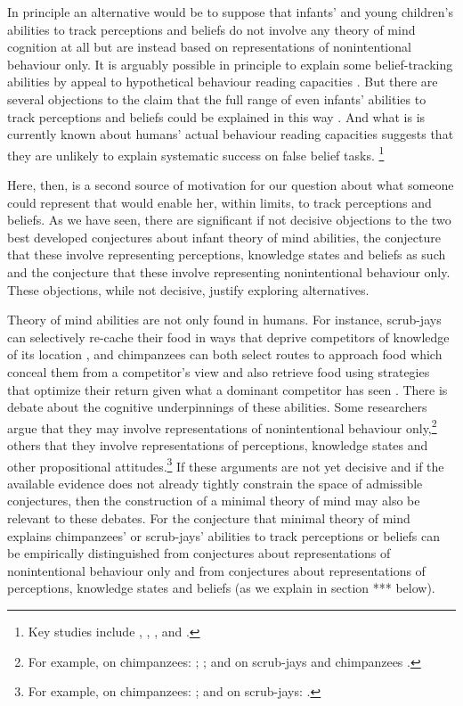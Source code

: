 \documentclass[12pt,\papersize]{extarticle}
\begin{document}
In principle an alternative would be to suppose that infants' and young children's abilities to track perceptions and beliefs 
do not involve any theory of mind cognition at all
but are instead based on 
representations of nonintentional behaviour only.
It is arguably possible in principle to explain some belief-tracking abilities by appeal to hypothetical behaviour reading capacities  \citep{perner:1988_developing,en_1168, en_1169}.
But there are several objections to the claim that the full range of even infants' abilities to track perceptions and beliefs could be explained in this way \citep{en_1691,Apperly:2009ju}.  
And what is is currently known about humans' actual behaviour reading capacities suggests that they are unlikely to explain systematic success on false belief tasks.%
\footnote{
Key studies include
	\citet{Newtson:1976ni}, 
	\citet{Byrne:1999jk},
	\citet{Baldwin:2001rs},
	\citet{Saylor:2007pj} and
	\citet{Baldwin:2008mw}.
} 
 
Here, then, is a second source of motivation for our question about what someone could represent that would enable her, within limits, to track perceptions and beliefs.
As we have seen, there are significant if not decisive objections to the two best developed conjectures about infant theory of mind abilities, the conjecture that these involve representing perceptions, knowledge states and beliefs as such and the conjecture that these involve representing nonintentional behaviour only.  
These objections, while not decisive, justify exploring alternatives.

Theory of mind abilities are not only found in humans.
For instance,
scrub-jays can selectively re-cache their food in ways that deprive competitors of knowledge of its location \citep{Clayton:2007fh}, and  chimpanzees can both select routes to approach food which conceal them from a competitor’s view \citep[]{en_1546} and also retrieve food using strategies that optimize their return given what a dominant competitor has seen \citep[]{en_1545}.  
There is debate about the cognitive underpinnings of these abilities. 
Some researchers argue that they may involve representations of nonintentional behaviour only,\footnote{
For example, on chimpanzees: 
	\citet{povinelli:2004vonk}; 
	\citet[pp.\ 364-5]{Vonk:2006cq}; and on scrub-jays and chimpanzees \citet{Penn:2007ey}.
} 
others that they involve representations of perceptions, knowledge states and other propositional attitudes.\footnote{
For example, on chimpanzees: \citet{Tomasello:2005ce,
			Call:2008di}; and on scrub-jays: 
			\citet[p.\ 73]{Emery:2007ze}.
}
If these arguments are not yet decisive
and if the available evidence does not already tightly constrain the space of admissible conjectures,
then the construction of a minimal theory of mind may also be relevant to these debates.
For the conjecture that minimal theory of mind explains chimpanzees' or scrub-jays' abilities to track perceptions or beliefs can be empirically distinguished from conjectures about representations of nonintentional behaviour only and from conjectures about representations of perceptions, knowledge states and beliefs (as we explain in section *** below).
\end{document}
